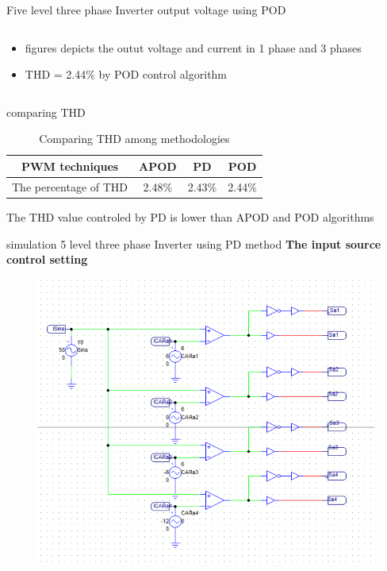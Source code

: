 \documentclass[
	11pt, %
]{beamer}
\begin{document}
\begin{frame}{Five level three phase Inverter output voltage using POD}
\begin{columns}
\begin{column}{0.5\textwidth}
\begin{figure}
		\end{figure}
		\begin{itemize}
			\scriptsize
			\item {figures depicts the outut voltage and current in 1 phase and 3 phases}
			\item {THD = 2.44\% by POD control algorithm}
		\end{itemize}
	\end{column}
  \end{columns}
\end{frame}

\begin{frame}{comparing THD}
	\begin{table}[htbp]
		\centering
		\caption{Comparing THD among methodologies}
		\label{tab:example}
		\begin{tabular}{|c|c|c|c|}
			\hline
			PWM techniques & APOD & PD & POD \\
			\hline
			The percentage of THD & 2.48\% & 2.43\% & 2.44\% \\
			\hline
		\end{tabular}
	\end{table}
	\begin{center}
		\scriptsize{The THD value controled by PD is lower than APOD and POD algorithms}	
	\end{center}
\end{frame}

\begin{frame}{simulation 5 level three phase Inverter using PD method}
	\scriptsize{\textbf{The input source control setting}}
	\begin{figure}
        \includegraphics[width=0.8\linewidth]{Sim_PD_source.png}
    \end{figure}
\end{frame}
\end{document}
